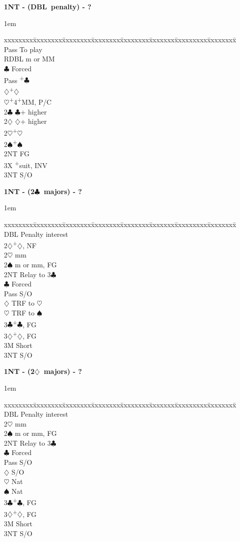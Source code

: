 \documentclass[10pt]{article}
\renewcommand{\c}{$\clubsuit$}
\renewcommand{\d}{$\diamondsuit$}
\newcommand{\h}{$\heartsuit$}
\newcommand{\s}{$\spadesuit$}
\newcommand{\p}{\textsuperscript{+}}
\newcommand{\x}{DBL}
\newcommand{\xx}{RDBL}
\newenvironment{bidtable}[1][]
{\textbf{#1}
  \begin{adjustwidth}{1em}{}
    \addvspace{2pt}
    \begin{tabbing}
      xxxxxxxx\=xxxxxxxx\=xxxxxxxx\=xxxxxxxx\=xxxxxxxx\=xxxxxxx\=xxxxxxxxx\=xxxxxxxx\=\kill}
{\end{tabbing}\end{adjustwidth}\bigskip}%
\begin{document}
\begin{bidtable}[1NT - (\x\ penalty) - ?]
Pass \> To play                       \\
\xx  \> m or MM                       \\
     \c \> Forced                 \\
     \>     \> Pass \p\c          \\
     \>     \d  {}\p\d          \\
     \>     \h  {}\p4\p MM, P/C \\
2\c  \> \c + higher                   \\
2\d  \> \d + higher                   \\
2\h  {}\p\h                         \\
2\s  {}\p\s                         \\
2NT  \> FG                            \\
3X   \p suit, INV                 \\
3NT  \> S/O
\end{bidtable}

\begin{bidtable}[1NT - (2\c\ majors) - ?]
\x  \> Penalty interest         \\
2\d {}\p\d, NF                \\
2\h \> mm                       \\
2\s \> m or mm, FG              \\
2NT \> Relay to 3\c             \\
    \c \> Forced            \\
    \>     \> Pass \> S/O       \\
    \>     \d  \> TRF to \h \\
    \>     \h  \> TRF to \s \\
3\c {}\p\c, FG                \\
3\d {}\p\d, FG                \\
3M  \> Short                    \\
3NT \> S/O
\end{bidtable}

\begin{bidtable}[1NT - (2\d\ majors) - ?]
\x  \> Penalty interest   \\
2\h \> mm                 \\
2\s \> m or mm, FG        \\
2NT \> Relay to 3\c       \\
    \c \> Forced      \\
    \>     \> Pass \> S/O \\
    \>     \d  \> S/O \\
    \>     \h  \> Nat \\
    \>     \s  \> Nat \\
3\c {}\p\c, FG          \\
3\d {}\p\d, FG          \\
3M  \> Short              \\
3NT \> S/O
\end{bidtable}
\end{document}
